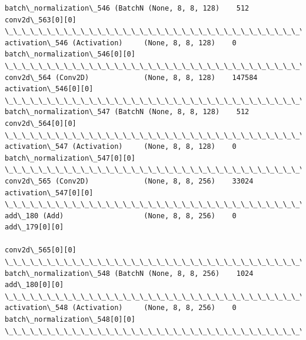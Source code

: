 \documentclass[11pt]{article}
\begin{document}
\begin{Verbatim}[commandchars=\\\{\}]
batch\_normalization\_546 (BatchN (None, 8, 8, 128)    512         conv2d\_563[0][0]                 
\_\_\_\_\_\_\_\_\_\_\_\_\_\_\_\_\_\_\_\_\_\_\_\_\_\_\_\_\_\_\_\_\_\_\_\_\_\_\_\_\_\_\_\_\_\_\_\_\_\_\_\_\_\_\_\_\_\_\_\_\_\_\_\_\_\_\_\_\_\_\_\_\_\_\_\_\_\_\_\_\_\_\_\_\_\_\_\_\_\_\_\_\_\_\_\_\_\_
activation\_546 (Activation)     (None, 8, 8, 128)    0           batch\_normalization\_546[0][0]    
\_\_\_\_\_\_\_\_\_\_\_\_\_\_\_\_\_\_\_\_\_\_\_\_\_\_\_\_\_\_\_\_\_\_\_\_\_\_\_\_\_\_\_\_\_\_\_\_\_\_\_\_\_\_\_\_\_\_\_\_\_\_\_\_\_\_\_\_\_\_\_\_\_\_\_\_\_\_\_\_\_\_\_\_\_\_\_\_\_\_\_\_\_\_\_\_\_\_
conv2d\_564 (Conv2D)             (None, 8, 8, 128)    147584      activation\_546[0][0]             
\_\_\_\_\_\_\_\_\_\_\_\_\_\_\_\_\_\_\_\_\_\_\_\_\_\_\_\_\_\_\_\_\_\_\_\_\_\_\_\_\_\_\_\_\_\_\_\_\_\_\_\_\_\_\_\_\_\_\_\_\_\_\_\_\_\_\_\_\_\_\_\_\_\_\_\_\_\_\_\_\_\_\_\_\_\_\_\_\_\_\_\_\_\_\_\_\_\_
batch\_normalization\_547 (BatchN (None, 8, 8, 128)    512         conv2d\_564[0][0]                 
\_\_\_\_\_\_\_\_\_\_\_\_\_\_\_\_\_\_\_\_\_\_\_\_\_\_\_\_\_\_\_\_\_\_\_\_\_\_\_\_\_\_\_\_\_\_\_\_\_\_\_\_\_\_\_\_\_\_\_\_\_\_\_\_\_\_\_\_\_\_\_\_\_\_\_\_\_\_\_\_\_\_\_\_\_\_\_\_\_\_\_\_\_\_\_\_\_\_
activation\_547 (Activation)     (None, 8, 8, 128)    0           batch\_normalization\_547[0][0]    
\_\_\_\_\_\_\_\_\_\_\_\_\_\_\_\_\_\_\_\_\_\_\_\_\_\_\_\_\_\_\_\_\_\_\_\_\_\_\_\_\_\_\_\_\_\_\_\_\_\_\_\_\_\_\_\_\_\_\_\_\_\_\_\_\_\_\_\_\_\_\_\_\_\_\_\_\_\_\_\_\_\_\_\_\_\_\_\_\_\_\_\_\_\_\_\_\_\_
conv2d\_565 (Conv2D)             (None, 8, 8, 256)    33024       activation\_547[0][0]             
\_\_\_\_\_\_\_\_\_\_\_\_\_\_\_\_\_\_\_\_\_\_\_\_\_\_\_\_\_\_\_\_\_\_\_\_\_\_\_\_\_\_\_\_\_\_\_\_\_\_\_\_\_\_\_\_\_\_\_\_\_\_\_\_\_\_\_\_\_\_\_\_\_\_\_\_\_\_\_\_\_\_\_\_\_\_\_\_\_\_\_\_\_\_\_\_\_\_
add\_180 (Add)                   (None, 8, 8, 256)    0           add\_179[0][0]                    
                                                                 conv2d\_565[0][0]                 
\_\_\_\_\_\_\_\_\_\_\_\_\_\_\_\_\_\_\_\_\_\_\_\_\_\_\_\_\_\_\_\_\_\_\_\_\_\_\_\_\_\_\_\_\_\_\_\_\_\_\_\_\_\_\_\_\_\_\_\_\_\_\_\_\_\_\_\_\_\_\_\_\_\_\_\_\_\_\_\_\_\_\_\_\_\_\_\_\_\_\_\_\_\_\_\_\_\_
batch\_normalization\_548 (BatchN (None, 8, 8, 256)    1024        add\_180[0][0]                    
\_\_\_\_\_\_\_\_\_\_\_\_\_\_\_\_\_\_\_\_\_\_\_\_\_\_\_\_\_\_\_\_\_\_\_\_\_\_\_\_\_\_\_\_\_\_\_\_\_\_\_\_\_\_\_\_\_\_\_\_\_\_\_\_\_\_\_\_\_\_\_\_\_\_\_\_\_\_\_\_\_\_\_\_\_\_\_\_\_\_\_\_\_\_\_\_\_\_
activation\_548 (Activation)     (None, 8, 8, 256)    0           batch\_normalization\_548[0][0]    
\_\_\_\_\_\_\_\_\_\_\_\_\_\_\_\_\_\_\_\_\_\_\_\_\_\_\_\_\_\_\_\_\_\_\_\_\_\_\_\_\_\_\_\_\_\_\_\_\_\_\_\_\_\_\_\_\_\_\_\_\_\_\_\_\_\_\_\_\_\_\_\_\_\_\_\_\_\_\_\_\_\_\_\_\_\_\_\_\_\_\_\_\_\_\_\_\_\_

\end{Verbatim}
\end{document}
